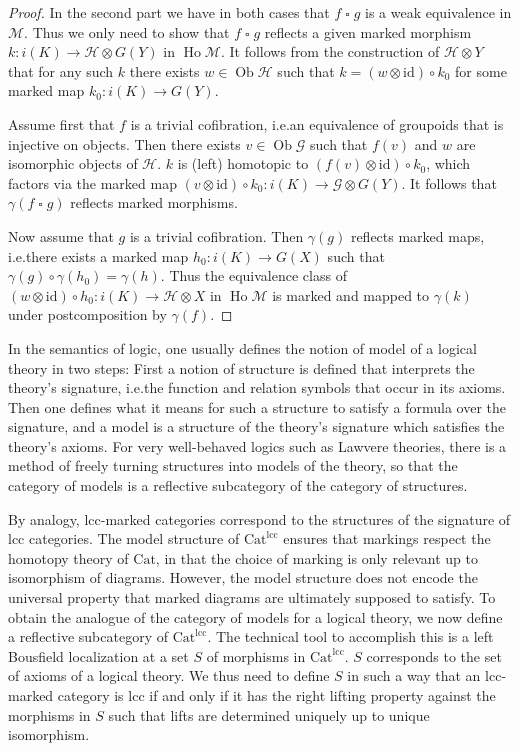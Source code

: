 \documentclass[a4paper]{article}
\theoremstyle{remark}
\theoremstyle{definition}
\begin{document}
\begin{proof}
  In the second part we have in both cases that $f \mathbin{\square} g$ is a weak equivalence in $\mathcal{M}$.
  Thus we only need to show that $f \mathbin{\square} g$ reflects a given marked morphism $k : i(K) \rightarrow \mathcal{H} \otimes G(Y)$ in $\operatorname{Ho} \mathcal{M}$.
  It follows from the construction of $\mathcal{H} \otimes Y$ that for any such $k$ there exists $w \in \operatorname{Ob} \mathcal{H}$ such that $k = (w \otimes \mathrm{id}) \circ k_0$ for some marked map $k_0 : i(K) \rightarrow G(Y)$.

  Assume first that $f$ is a trivial cofibration, i.e.\@ an equivalence of groupoids that is injective on objects.
  Then there exists $v \in \operatorname{Ob} \mathcal{G}$ such that $f(v)$ and $w$ are isomorphic objects of $\mathcal{H}$.
  $k$ is (left) homotopic to $(f(v) \otimes \mathrm{id}) \circ k_0$, which factors via the marked map $(v \otimes \mathrm{id}) \circ k_0 : i(K) \rightarrow \mathcal{G} \otimes G(Y)$.
  It follows that $\gamma(f \mathbin{\square} g)$ reflects marked morphisms.

  Now assume that $g$ is a trivial cofibration.
  Then $\gamma(g)$ reflects marked maps, i.e.\@ there exists a marked map $h_0 : i(K) \rightarrow G(X)$ such that $\gamma(g) \circ \gamma(h_0) = \gamma(h)$.
  Thus the equivalence class of $(w \otimes \mathrm{id}) \circ h_0 : i(K) \rightarrow \mathcal{H} \otimes X$ in $\operatorname{Ho} \mathcal{M}$ is marked and mapped to $\gamma(k)$ under postcomposition by $\gamma(f)$.
\end{proof}

In the semantics of logic, one usually defines the notion of model of a logical theory in two steps:
First a notion of structure is defined that interprets the theory's signature, i.e.\@ the function and relation symbols that occur in its axioms.
Then one defines what it means for such a structure to satisfy a formula over the signature, and a model is a structure of the theory's signature which satisfies the theory's axioms.
For very well-behaved logics such as Lawvere theories, there is a method of freely turning structures into models of the theory, so that the category of models is a reflective subcategory of the category of structures.

By analogy, lcc-marked categories correspond to the structures of the signature of lcc categories.
The model structure of $\mathrm{Cat}^{\mathrm{lcc}}$ ensures that markings respect the homotopy theory of $\mathrm{Cat}$, in that the choice of marking is only relevant up to isomorphism of diagrams.
However, the model structure does not encode the universal property that marked diagrams are ultimately supposed to satisfy.
To obtain the analogue of the category of models for a logical theory, we now define a reflective subcategory of $\mathrm{Cat}^{\mathrm{lcc}}$.
The technical tool to accomplish this is a left Bousfield localization at a set $S$ of morphisms in $\mathrm{Cat}^{\mathrm{lcc}}$.
$S$ corresponds to the set of axioms of a logical theory.
We thus need to define $S$ in such a way that an lcc-marked category is lcc if and only if it has the right lifting property against the morphisms in $S$ such that lifts are determined uniquely up to unique isomorphism.
\end{document}
